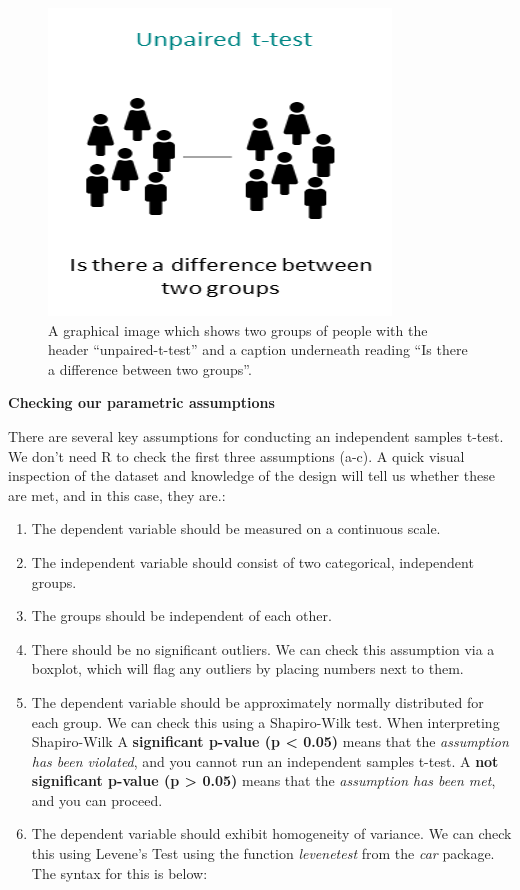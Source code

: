 \documentclass[
]{book}
\begin{document}
\begin{figure}
\centering
\includegraphics{img/05-IndependentSamples t-test.png}
\caption{A graphical image which shows two groups of people with the header ``unpaired-t-test'' and a caption underneath reading ``Is there a difference between two groups''.}
\end{figure}

\textbf{Checking our parametric assumptions}

There are several key assumptions for conducting an independent samples t-test. We don't need R to check the first three assumptions (a-c). A quick visual inspection of the dataset and knowledge of the design will tell us whether these are met, and in this case, they are.:

\begin{enumerate}
\def\labelenumi{\alph{enumi}.}
\item
  The dependent variable should be measured on a continuous scale.
\item
  The independent variable should consist of two categorical, independent groups.
\item
  The groups should be independent of each other.
\item
  There should be no significant outliers. We can check this assumption via a boxplot, which will flag any outliers by placing numbers next to them.
\item
  The dependent variable should be approximately normally distributed for each group. We can check this using a Shapiro-Wilk test. When interpreting Shapiro-Wilk A \textbf{significant p-value (p \textless{} 0.05)} means that the \emph{assumption has been violated}, and you cannot run an independent samples t-test. A \textbf{not significant p-value (p \textgreater{} 0.05)} means that the \emph{assumption has been met}, and you can proceed.
\item
  The dependent variable should exhibit homogeneity of variance. We can check this using Levene's Test using the function \emph{levenetest} from the \emph{car} package. The syntax for this is below:
\end{enumerate}
\end{document}
